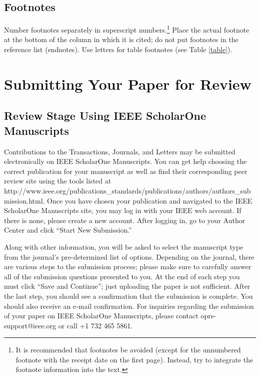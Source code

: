 \documentclass[journal,twoside,web]{ieeecolor}
\begin{document}
\subsection{Footnotes}
Number footnotes separately in superscript numbers.\footnote{It is recommended that footnotes be avoided (except for 
the unnumbered footnote with the receipt date on the first page). Instead, 
try to integrate the footnote information into the text.} Place the actual 
footnote at the bottom of the column in which it is cited; do not put 
footnotes in the reference list (endnotes). Use letters for table footnotes 
(see Table \ref{table}).

\section*{Submitting Your Paper for Review}           

\subsection{Review Stage Using IEEE ScholarOne Manuscripts}

Contributions to the Transactions, Journals, and Letters may be submitted electronically on IEEE ScholarOne Manuscripts. You can get help choosing the correct publication for your manuscript as well as find their corresponding peer review site using the tools listed at http://\discretionary{}{}{}www.ieee.org/\discretionary{}{}{}publications\_standards/\discretionary{}{}{}publications/\discretionary{}{}{}authors/\discretionary{}{}{}authors\_submission.html. Once you have chosen your publication and navigated to the IEEE ScholarOne Manuscripts site, you may log in with your IEEE web account. If there is none, please create a new account. After logging in, go to your Author Center and click ``Start New Submission.''

Along with other information, you will be asked to select the manuscript type from the journal's pre-determined list of options. Depending on the journal, there are various steps to the submission process; please make sure to carefully answer all of the submission questions presented to you. At the end of each step you must click ``Save and Continue''; just uploading the paper is not sufficient. After the last step, you should see a confirmation that the submission is complete. You should also receive an e-mail confirmation. For inquiries regarding the submission of your paper on IEEE ScholarOne Manuscripts, please contact oprs-support@ieee.org or call +1 732 465 5861.
\end{document}
